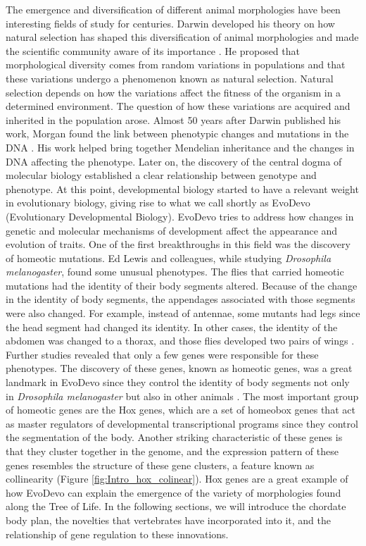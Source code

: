 The emergence and diversification of different animal morphologies have been interesting fields of study for centuries. Darwin developed his theory on how natural selection has shaped this diversification of animal morphologies and made the scientific community aware of its importance \parencite{darwin_origin_1859}. He proposed that morphological diversity comes from random variations in populations and that these variations undergo a phenomenon known as natural selection. Natural selection depends on how the variations affect the fitness of the organism in a determined environment. The question of how these variations are acquired and inherited in the population arose. Almost 50 years after Darwin published his work, Morgan found the link between phenotypic changes and mutations in the DNA \parencite{morgan_sex-linked_1916}. His work helped bring together Mendelian inheritance and the changes in DNA affecting the phenotype. Later on, the discovery of the central dogma of molecular biology established a clear relationship between genotype and phenotype. At this point, developmental biology started to have a relevant weight in evolutionary biology, giving rise to what we call shortly as EvoDevo (Evolutionary Developmental Biology). 
EvoDevo tries to address how changes in genetic and molecular mechanisms of development affect the appearance and evolution of traits. One of the first breakthroughs in this field was the discovery of homeotic mutations. Ed Lewis and colleagues, while studying  \textit{Drosophila melanogaster}, found some unusual phenotypes. The flies that carried homeotic mutations had the identity of their body segments altered. Because of the change in the identity of body segments, the appendages associated with those segments were also changed. For example, instead of antennae, some mutants had legs since the head segment had changed its identity. In other cases, the identity of the abdomen was changed to a thorax, and those flies developed two pairs of wings \parencite{lewis_gene_1978}. Further studies revealed that only a few genes were responsible for these phenotypes. The discovery of these genes, known as homeotic genes, was a great landmark in EvoDevo since they control the identity of body segments not only in \textit{Drosophila melanogaster} but also in other animals \parencite{duboule_structural_1989, gehring_homeotic_1985, mcginnis_homeobox_1992, hueber_improving_2010, krumlauf_hox_2018}. The most important group of homeotic genes are the Hox genes, which are a set of homeobox genes that act as master regulators of developmental transcriptional programs since they control the segmentation of the body. Another striking characteristic of these genes is that they cluster together in the genome, and the expression pattern of these genes resembles the structure of these gene clusters, a feature known as collinearity (Figure \ref{fig:Intro_hox_colinear}). Hox genes are a great example of how EvoDevo can explain the emergence of the variety of morphologies found along the Tree of Life. In the following sections, we will introduce the chordate body plan, the novelties that vertebrates have incorporated into it, and the relationship of gene regulation to these innovations. 
